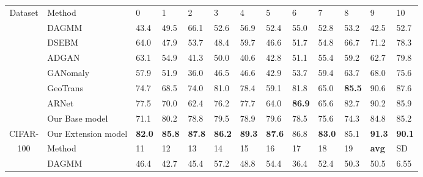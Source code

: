 \documentclass[journal]{IEEEtran}
\theoremstyle{remark}
\begin{document}
\begin{table*}[!htb]
	\begin{minipage}[t]{0.92\textwidth}
	\small
	\begin{tabular}{cx{3.0cm}x{0.7cm}x{0.7cm}x{0.7cm}x{0.7cm}x{0.7cm}x{0.7cm}x{0.7cm}x{0.7cm}x{0.7cm}x{0.7cm}x{0.8cm}}
		Dataset & Method & 0 & 1 & 2 & 3 & 4 & 5 & 6 & 7 & 8 & 9 & 10\\
		\cmidrule(lr){1-1} \cmidrule(lr){2-2} \cmidrule(lr){3-3} \cmidrule(lr){4-4} \cmidrule(lr){5-5} \cmidrule(lr){6-6} \cmidrule(lr){7-7} \cmidrule(lr){8-8} \cmidrule(lr){9-9} \cmidrule(lr){10-10} \cmidrule(lr){11-11} \cmidrule(lr){12-12} \cmidrule(lr){13-13}
		& DAGMM~\cite{zhai2016deep} 
		& 43.4 & 49.5 & 66.1 & 52.6 & 56.9 & 52.4 & 55.0 & 52.8 & 53.2 & 42.5 & 52.7\\
		& DSEBM~\cite{zong2018deep} 
		& 64.0 & 47.9 & 53.7 & 48.4 & 59.7 & 46.6 & 51.7 & 54.8 & 66.7 & 71.2 & 78.3 \\
		& ADGAN~\cite{deecke2018anomaly} 
		& 63.1 & 54.9 & 41.3 & 50.0 & 40.6 & 42.8 & 51.1 & 55.4 & 59.2 & 62.7 & 79.8 \\
		& GANomaly~\cite{Akcay2018} 
		& 57.9 & 51.9 & 36.0 & 46.5 & 46.6 & 42.9 & 53.7 & 59.4 & 63.7 & 68.0 & 75.6\\
		& GeoTrans~\cite{golan2018deep} 
		& 74.7 & 68.5 & 74.0 & 81.0 & 78.4 & 59.1 & 81.8 & 65.0 & \textbf{85.5} & 90.6 & 87.6\\
		& ARNet~\cite{fye2020ARNet} & 77.5 & 70.0 & 62.4 & 76.2 & 77.7 & 64.0 & \textbf{86.9} & 65.6 & 82.7 & 90.2 & 85.9 \\
		\cmidrule(lr){2-2} \cmidrule(lr){3-3} \cmidrule(lr){4-4} \cmidrule(lr){5-5} \cmidrule(lr){6-6} \cmidrule(lr){7-7} \cmidrule(lr){8-8} \cmidrule(lr){9-9} \cmidrule(lr){10-10} \cmidrule(lr){11-11} \cmidrule(lr){12-12} \cmidrule(lr){13-13}
		&Our Base model & 71.1 & 80.2 & 78.8 & 79.5 & 78.9 & 79.6 & 78.5 & 75.6 & 74.3 & 84.8 & 85.2\\
		CIFAR-& Our Extension model & \textbf{82.0} & \textbf{85.8} & \textbf{87.8} & \textbf{86.2} & \textbf{89.3} & \textbf{87.6} & 86.8 & \textbf{83.0} & 85.1 & \textbf{91.3} & \textbf{90.1} \\
		\cmidrule(lr){2-13}
		100 & Method & 11 & 12 & 13 & 14 & 15 & 16 & 17 & 18 & 19 & \textbf{avg} & SD\\
		\cmidrule(lr){2-2} \cmidrule(lr){3-3} \cmidrule(lr){4-4} \cmidrule(lr){5-5} \cmidrule(lr){6-6} \cmidrule(lr){7-7} \cmidrule(lr){8-8} \cmidrule(lr){9-9} \cmidrule(lr){10-10} \cmidrule(lr){11-11} \cmidrule(lr){12-12} \cmidrule(lr){13-13} 
		& DAGMM~\cite{zhai2016deep}  
		& 46.4 & 42.7 & 45.4 & 57.2 & 48.8 & 54.4 & 36.4 & 52.4 & 50.3 & 50.5 & 6.55\\

\end{tabular}
\end{minipage}
\end{table*}
\end{document}

